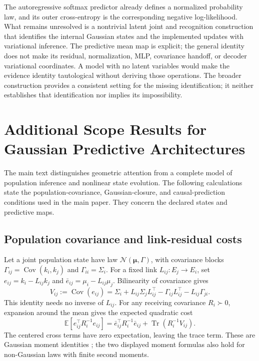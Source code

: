 \documentclass[twoside,11pt]{article}
\begin{document}
The autoregressive softmax predictor already defines a normalized probability law, and its outer cross-entropy is the corresponding negative log-likelihood. What remains unresolved is a nontrivial latent joint and recognition construction that identifies the internal Gaussian states and the implemented updates with variational inference. The predictive mean map is explicit; the general identity does not make its residual, normalization, MLP, covariance handoff, or decoder variational coordinates. A model with no latent variables would make the evidence identity tautological without deriving those operations. The broader construction provides a consistent setting for the missing identification; it neither establishes that identification nor implies its impossibility.


\section{Additional Scope Results for Gaussian Predictive Architectures}
\label{app:architecture_scope}

The main text distinguishes geometric attention from a complete model of population inference and nonlinear state evolution. The following calculations state the population-covariance, Gaussian-closure, and causal-prediction conditions used in the main paper. They concern the declared states and predictive maps.

\subsection{Population covariance and link-residual costs}
\label{sec:population_link_residuals}

Let a joint population state have law
\(\mathcal N(\boldsymbol\mu,\Gamma)\), with covariance blocks
\(\Gamma_{ij}=\operatorname{Cov}(k_i,k_j)\) and
\(\Gamma_{ii}=\Sigma_i\). For a fixed link \(L_{ij}:E_j\to E_i\), set
\(e_{ij}=k_i-L_{ij}k_j\) and
\(\bar e_{ij}=\mu_i-L_{ij}\mu_j\). Bilinearity of covariance gives
\begin{equation}
V_{ij}:=\operatorname{Cov}(e_{ij})
=\Sigma_i+L_{ij}\Sigma_jL_{ij}^{\top}
-\Gamma_{ij}L_{ij}^{\top}-L_{ij}\Gamma_{ji}.
\label{eq:population_residual_covariance}
\end{equation}
This identity needs no inverse of \(L_{ij}\). For any receiving covariance \(R_i\succ0\), expansion around the mean gives the expected quadratic cost
\begin{equation}
\mathbb E[e_{ij}^{\top}R_i^{-1}e_{ij}]
=\bar e_{ij}^{\top}R_i^{-1}\bar e_{ij}
+\operatorname{Tr}(R_i^{-1}V_{ij}).
\label{eq:population_residual_cost}
\end{equation}
The centered cross terms have zero expectation, leaving the trace term. These are Gaussian moment identities \citep{Bishop2006}; the two displayed moment formulas also hold for non-Gaussian laws with finite second moments.
\end{document}
